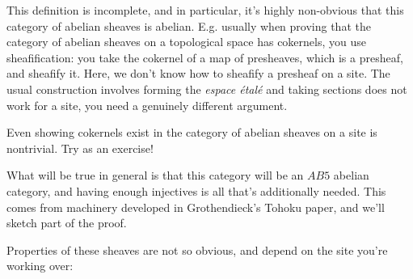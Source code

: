 \begin{remark}

This definition is incomplete, and in particular, it's highly
non-obvious that this category of abelian sheaves is abelian. E.g.
usually when proving that the category of abelian sheaves on a
topological space has cokernels, you use sheafification: you take the
cokernel of a map of presheaves, which is a presheaf, and sheafify it.
Here, we don't know how to sheafify a presheaf on a site. The usual
construction involves forming the \emph{espace étalé} and taking
sections does not work for a site, you need a genuinely different
argument.

\end{remark}

\begin{warnings}

Even showing cokernels exist in the category of abelian sheaves on a
site is nontrivial. Try as an exercise!

\end{warnings}

\begin{remark}

What will be true in general is that this category will be an \(AB5\)
abelian category, and having enough injectives is all that's
additionally needed. This comes from machinery developed in
Grothendieck's Tohoku paper, and we'll sketch part of the proof.

\end{remark}

Properties of these sheaves are not so obvious, and depend on the site
you're working over:

